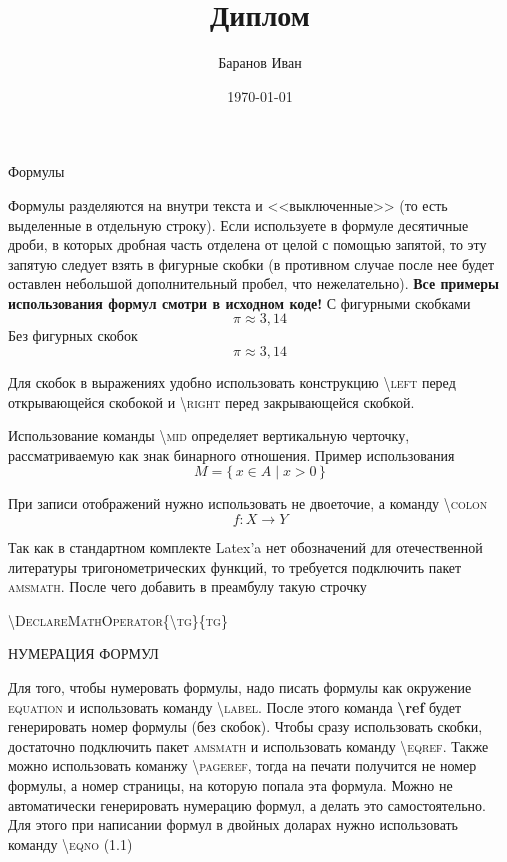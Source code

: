 \documentclass[a4paper,14pt]{extarticle}
\author{Баранов Иван}
\title{Диплом}
\date{\today}
\theoremstyle{plain} %
\theoremstyle{definition} %
\theoremstyle{remark} %
\begin{document}
\begin{center}
	Формулы
\end{center}
Формулы разделяются на внутри текста и <<выключенные>> (то есть выделенные в отдельную строку). \newline
Если используете в формуле десятичные дроби, в которых дробная часть отделена от целой с помощью запятой, то эту запятую следует взять в фигурные скобки (в противном случае после нее будет оставлен небольшой дополнительный пробел, что нежелательно).\newline
\textbf{Все примеры использования формул смотри в исходном коде!}\newline
С фигурными скобками
$$
	\pi\approx 3{,}14
$$
Без фигурных скобок
$$
	\pi\approx 3,14
$$

Для скобок в выражениях удобно использовать конструкцию \textsc{\textbackslash left} перед открывающейся скобокой и \textsc{\textbackslash right} перед закрывающейся скобкой. \newline

Использование команды \textsc{\textbackslash mid} определяет вертикальную черточку, рассматриваемую как знак бинарного отношения. Пример использования
\begin{equation*}
	M=\{\,x\in A\mid x>0\, \}
\end{equation*}

При записи отображений нужно использовать не двоеточие, а команду \textsc{\textbackslash colon}
\begin{equation*}
	f\colon X\to Y
\end{equation*}

Так как в стандартном комплекте Latex'a нет обозначений для отечественной литературы тригонометрических функций, то требуется подключить пакет \textsc{amsmath}. После чего добавить в преамбулу такую строчку
\begin{center}
	\textsc{\textbackslash DeclareMathOperator\{\textbackslash tg\}\{tg\}}
\end{center}

НУМЕРАЦИЯ ФОРМУЛ

Для того, чтобы нумеровать формулы, надо писать формулы как окружение \textsc{equation} и использовать команду \textsc{\textbackslash label}. После этого команда \textbf{\textbackslash ref} будет генерировать номер формулы (без скобок). Чтобы сразу использовать скобки, достаточно подключить пакет \textsc{amsmath} и использовать команду \textsc{\textbackslash eqref}. Также можно использовать команжу \textsc{\textbackslash pageref}, тогда на печати получится не номер формулы, а номер страницы, на которую попала эта формула.\newline
Можно не автоматически генерировать нумерацию формул, а делать это самостоятельно. Для этого при написании формул в двойных доларах нужно использовать команду \textsc{\textbackslash eqno (1.1)}
\end{document}
